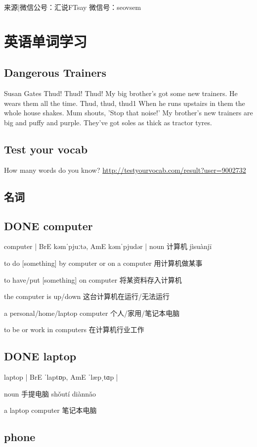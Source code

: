 \documentclass[11pt]{ctexart}
\begin{document}
{{{{来源|微信公号：汇说FTsay 微信号：seovsem
\section{英语单词学习}
\label{sec:org171164e}
\subsection{Dangerous Trainers}
\label{sec:org5afd786}
Susan Gates
Thud! Thud! Thud!
My big brother's got some new trainers.
He wears them all the time.
Thud, thud, thud1 When he runs upstairs in them the whole house shakes.
Mum shouts, 'Stop that noise!'
My brother's new trainers are big and puffy and purple. They've got soles as
thick as tractor tyres.
\subsection{Test your vocab}
\label{sec:orgc3cffcc}
How many words do you know?
\url{http://testyourvocab.com/result?user=9002732}
\subsection{名词}
\label{sec:org65fab04}
\subsection{{\bfseries\sffamily DONE} computer}
\label{sec:orgc603ba9}
computer | BrE kəmˈpjuːtə, AmE kəmˈpjudər |
noun 计算机 jìsuànjī

to do [something] by computer or on a computer
用计算机做某事

to have/put [something] on computer
将某资料存入计算机

the computer is up/down
这台计算机在运行/无法运行

a personal/home/laptop computer
个人/家用/笔记本电脑

to be or work in computers
在计算机行业工作
\subsection{{\bfseries\sffamily DONE} laptop}
\label{sec:orgfb7df53}
laptop | BrE ˈlaptɒp, AmE ˈlæpˌtɑp |

noun 手提电脑 shǒutí diànnǎo

a laptop computer 笔记本电脑

\subsection{phone}
\label{sec:org9ef8211}

}}}}
\end{document}

